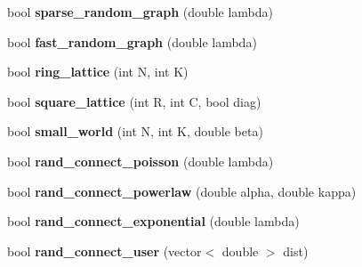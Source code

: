 \begin{DoxyCompactItemize}
\item 
\hypertarget{classelps_1_1_lab_network_afeddfebd976523d40bfec65349745baa}{bool {\bfseries sparse\-\_\-random\-\_\-graph} (double lambda)}\label{classelps_1_1_lab_network_afeddfebd976523d40bfec65349745baa}

\item 
\hypertarget{classelps_1_1_lab_network_a2d9009372e476006a5116b66f1e0b020}{bool {\bfseries fast\-\_\-random\-\_\-graph} (double lambda)}\label{classelps_1_1_lab_network_a2d9009372e476006a5116b66f1e0b020}

\item 
\hypertarget{classelps_1_1_lab_network_aeac66535d94501a0bb90f9c75159d757}{bool {\bfseries ring\-\_\-lattice} (int N, int K)}\label{classelps_1_1_lab_network_aeac66535d94501a0bb90f9c75159d757}

\item 
\hypertarget{classelps_1_1_lab_network_a43e3b11ab9e726e95382e0773e7221a1}{bool {\bfseries square\-\_\-lattice} (int R, int C, bool diag)}\label{classelps_1_1_lab_network_a43e3b11ab9e726e95382e0773e7221a1}

\item 
\hypertarget{classelps_1_1_lab_network_a31a7cc53fbab96bccfc2976e5da4160b}{bool {\bfseries small\-\_\-world} (int N, int K, double beta)}\label{classelps_1_1_lab_network_a31a7cc53fbab96bccfc2976e5da4160b}

\item 
\hypertarget{classelps_1_1_lab_network_af1d8160d7d649f8de90475e6468bd24e}{bool {\bfseries rand\-\_\-connect\-\_\-poisson} (double lambda)}\label{classelps_1_1_lab_network_af1d8160d7d649f8de90475e6468bd24e}

\item 
\hypertarget{classelps_1_1_lab_network_a6168c96080fdb3b376157a9cb1ff156e}{bool {\bfseries rand\-\_\-connect\-\_\-powerlaw} (double alpha, double kappa)}\label{classelps_1_1_lab_network_a6168c96080fdb3b376157a9cb1ff156e}

\item 
\hypertarget{classelps_1_1_lab_network_a156f6d27be41ca95c805342978165d24}{bool {\bfseries rand\-\_\-connect\-\_\-exponential} (double lambda)}\label{classelps_1_1_lab_network_a156f6d27be41ca95c805342978165d24}

\item 
\hypertarget{classelps_1_1_lab_network_a3a2eeb8efd39f25f981f4532ed2f943a}{bool {\bfseries rand\-\_\-connect\-\_\-user} (vector$<$ double $>$ dist)}\label{classelps_1_1_lab_network_a3a2eeb8efd39f25f981f4532ed2f943a}


\end{DoxyCompactItemize}
